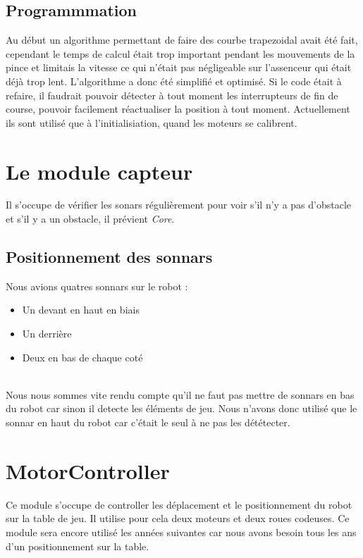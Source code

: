 \subsection{Programmmation}
Au début un algorithme permettant de faire des courbe trapezoidal avait été fait, cependant le temps de calcul était trop important pendant les mouvements de la pince et limitais la vitesse ce qui n'était pas négligeable sur l'assenceur qui était déjà trop lent. L'algorithme a donc été simplifié et optimisé. Si le code était à refaire, il faudrait pouvoir détecter à tout moment les interrupteurs de fin de course, pouvoir facilement réactualiser la position à tout moment. Actuellement ils sont utilisé que à l'initialisiation, quand les moteurs se calibrent.

\section{Le module capteur}
Il s'occupe de vérifier les sonars régulièrement pour voir s'il n'y a pas d'obstacle et s'il y a un obstacle, il prévient \textit{Core}.

\subsection{Positionnement des sonnars}
Nous avions quatres sonnars sur le robot :\\

\begin{itemize}
	\item Un devant en haut en biais
	\item Un derrière
	\item Deux en bas de chaque coté
\end{itemize}\ \\

Nous nous sommes vite rendu compte qu'il ne faut pas mettre de sonnars en bas du robot car sinon il detecte les éléments de jeu. Nous n'avons donc utilisé que le sonnar en haut du robot car c'était le seul à ne pas les dététecter.


\section{MotorController} 
Ce module s'occupe de controller les déplacement et le positionnement du robot sur la table de jeu. Il utilise pour cela deux moteurs et deux roues codeuses. Ce module sera encore utilisé les années suivantes car nous avons besoin tous les ans d'un positionnement sur la table.

